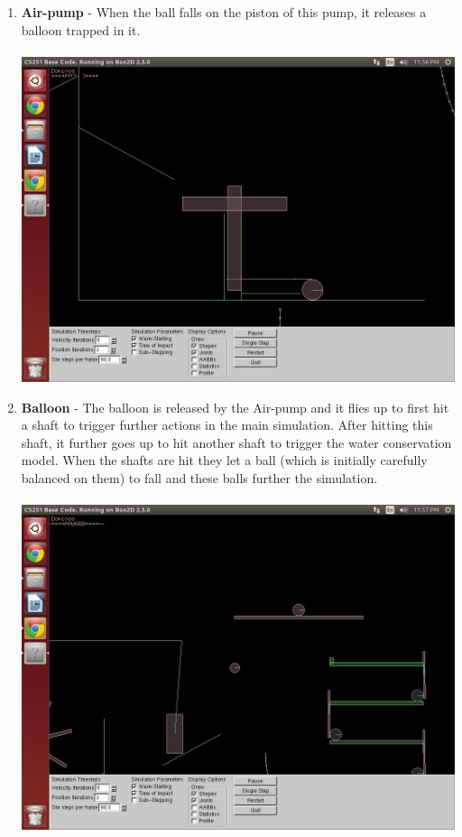 \documentclass{report}
\begin{document}
\begin{enumerate}
\item \textbf{Air-pump} - When the ball falls on the piston of this pump, it releases a balloon trapped in it.\\\\
\includegraphics[scale=0.25]{pics/AirPump}
\item \textbf{Balloon} - The balloon is released by the Air-pump and it flies up to first hit a shaft to trigger further actions in the main simulation. After hitting this shaft, it further goes up to hit another shaft to trigger the water conservation model. When the shafts are hit they let a ball (which is initially carefully balanced on them) to fall and these balls further the simulation.\\\\
\includegraphics[scale=0.25]{pics/FlyingBalloon}
\pagebreak


\end{enumerate}
\end{document}
